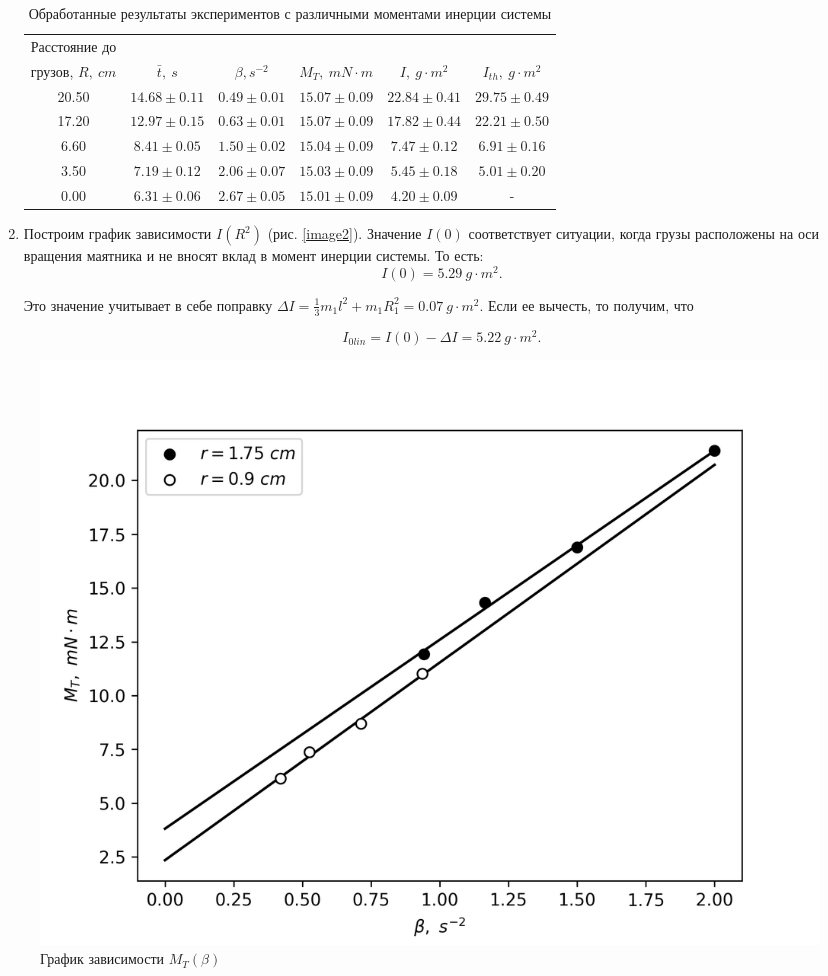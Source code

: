 \documentclass[14pt, a4paper]{article}
\begin{document}
\begin{enumerate}
\begin{table}[!h]
\centering
\begin{tabular}{| c | c | c | c | c | c |}
\hline
Расстояние до & & & & & \\
грузов, $R,\ cm$ & $\bar{t},\ s$ & $\beta, s^{-2}$ & $M_T,\ mN\cdot m$ & $I,\ g\cdot m^2$ & $I_{th},\ g\cdot m^2$ \\
\hline
20.50 & $14.68\pm 0.11$ & $0.49\pm 0.01$ & $15.07\pm 0.09$ & $22.84\pm 0.41$ & $29.75\pm 0.49$ \\
\hline
17.20 & $12.97\pm 0.15$ & $0.63\pm 0.01$ & $15.07\pm 0.09$ & $17.82\pm 0.44$ & $22.21\pm 0.50$ \\
\hline
6.60 & $8.41\pm 0.05$ & $1.50\pm 0.02$ & $15.04\pm 0.09$ & $7.47\pm 0.12$ & $6.91\pm 0.16$ \\
\hline
3.50 & $7.19\pm 0.12$ & $2.06\pm 0.07$ & $15.03\pm 0.09$ & $5.45\pm 0.18$ & $5.01\pm 0.20$ \\
\hline
0.00 & $6.31\pm 0.06$ & $2.67\pm 0.05$ & $15.01\pm 0.09$ & $4.20\pm 0.09$ & - \\
\hline
\end{tabular}
\caption{Обработанные результаты экспериментов с различными моментами инерции системы}
\label{table4}
\end{table}

\item Построим график зависимости $I(R^2)$ (рис. \ref{image2}).
Значение $I(0)$ соответствует ситуации, когда грузы расположены на оси вращения маятника и не вносят вклад в момент инерции системы. То есть:
\[I(0)=5.29\ g\cdot m^2.\]

Это значение учитывает в себе поправку $\Delta I=\frac{1}{3}m_1l^2+m_1R_1^2=0.07\ g\cdot m^2$. Если ее вычесть, то получим, что

\[I_{0lin}=I(0)-\Delta I=5.22\ g\cdot m^2.\]

\end{enumerate}

\begin{figure}
\includegraphics[width=\linewidth]{laba3_1.png}
\caption{График зависимости $M_T(\beta)$}
\label{image1}
\end{figure}
\end{document}
